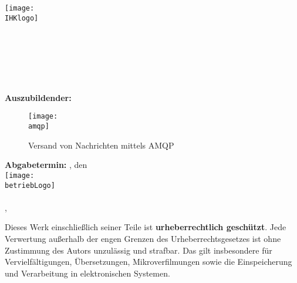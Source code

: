 \begin{titlepage}

\begin{center}
\texttt{[image: \\IHKlogo]}\\[0.5ex]
\Large{\ausbildungsberuf}\\
\LARGE{\betreff}\\
\huge{\textbf{\titelOne\\\titelTwo}}\\[0.5ex]
\Large{\textbf{\untertitelOne}}\\
\Large{\textbf{\untertitelTwo}}\\[1.5ex]

\normalsize
\textbf{Auszubildender:} \autorName\\[2.5ex]

\begin{figure}[htb]
    \centering
    \texttt{[image: \\amqp]}\\[1ex]
    \caption{Versand von Nachrichten mittels \ac{AMQP}}
    \label{fig:DMZ_Korea}
\end{figure}

\textbf{Abgabetermin:} \abgabeOrt{}, den \abgabeTermin\\[3ex]

\texttt{[image: \\betriebLogo]}\\
\betriebName{}\\
\betriebAnschrift{}, \betriebOrt\\[2.5ex]
\end{center}

\small
\noindent
Dieses Werk einschließlich seiner Teile ist \textbf{urheberrechtlich geschützt}.
Jede Verwertung außerhalb der engen Grenzen des Urheberrechtsgesetzes ist ohne Zustimmung des Autors unzulässig und strafbar.
Das gilt insbesondere für Vervielfältigungen, Übersetzungen, Mikroverfilmungen sowie die Einspeicherung und Verarbeitung in elektronischen Systemen.

\end{titlepage}